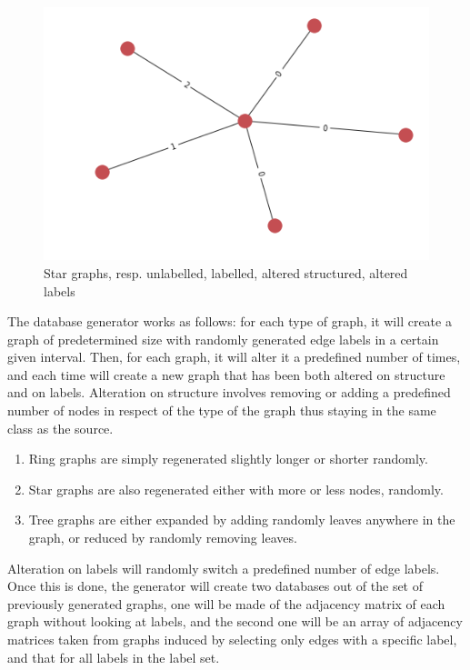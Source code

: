 \documentclass{article}
\theoremstyle{definition}
\begin{document}
\begin{figure}[!htb]
\begin{multicols}{4}
		\includegraphics[width=\linewidth]{data/generated-graphs/star_altered_labels.png}\par
	\end{multicols}
	\caption{Star graphs, resp. unlabelled, labelled, altered structured, altered labels}
\end{figure}
The database generator works as follows: for each type of graph, it will create a graph of predetermined size with randomly generated edge labels in a certain given interval. Then, for each graph, it will alter it a predefined number of times, and each time will create a new graph that has been both altered on structure and on labels. Alteration on structure involves removing or adding a predefined number of nodes in respect of the type of the graph thus staying in the same class as the source. 
\begin{enumerate}
	\item Ring graphs are simply regenerated slightly longer or shorter randomly.
	\item Star graphs are also regenerated either with more or less nodes, randomly.
	\item Tree graphs are either expanded by adding randomly leaves anywhere in the graph, or reduced by randomly removing leaves.
\end{enumerate}
Alteration on labels will randomly switch a predefined number of edge labels. Once this is done, the generator will create two databases out of the set of previously generated graphs, one will be made of the adjacency matrix of each graph without looking at labels, and the second one will be an array of adjacency matrices taken from graphs induced by selecting only edges with a specific label, and that for all labels in the label set.
\end{document}
